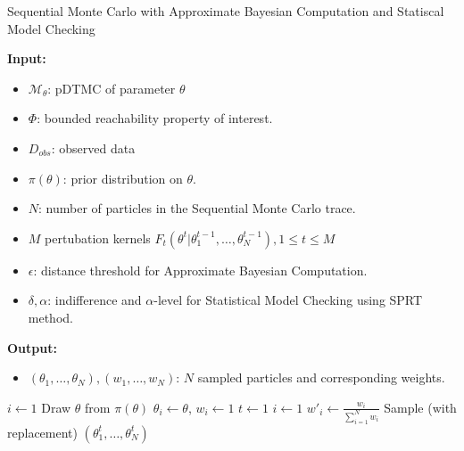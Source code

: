 \begin{algorithm}[H]
      \caption{Sequential Monte Carlo with Approximate Bayesian Computation and Statiscal Model Checking}
      \label{smc-abc-smc-alg}
      \footnotesize{
            \hspace*{\algorithmicindent} \textbf{Input:}
            \begin{itemize}
                  \item $\mathcal{M}_\theta$: pDTMC of parameter $\theta$
                  \item $\Phi$: bounded reachability property of interest.
                  \item $D_{obs}$: observed data
                  \item $\pi(\theta)$: prior distribution on $\theta$.
                  \item $N$: number of particles in the Sequential Monte Carlo trace.
                  \item $M$ pertubation kernels $F_t(\theta^t | \theta^{t-1}_1,\ldots,\theta^{t-1}_N), 1\leq t \leq M$
                  \item $\epsilon$: distance threshold for Approximate Bayesian Computation.
                  \item $\delta, \alpha$: indifference and $\alpha$-level for Statistical Model Checking using SPRT method.
            \end{itemize}
            \hspace*{\algorithmicindent} \textbf{Output:}
            \begin{itemize}
                  \item $(\theta_1,\ldots,\theta_N), (w_1,\ldots,w_N)$: $N$ sampled particles and corresponding weights.
            \end{itemize}
      }
      \begin{algorithmic}[1]
            \State $i \leftarrow 1$
             
            \State Draw $\theta$ from $\pi(\theta)$
            \State $\theta_i \leftarrow \theta$, $w_i \leftarrow 1$
            \EndWhile
            \State $t \leftarrow 1$
            \State $i \leftarrow 1$ 
            \State $w'_i \leftarrow \frac{w_i}{\sum_{i=1}^N w_i} $
            \EndWhile
            \State Sample (with replacement) $(\theta^t_1,\ldots,\theta^t_N)$ \\

\end{algorithmic}
\end{algorithm}

